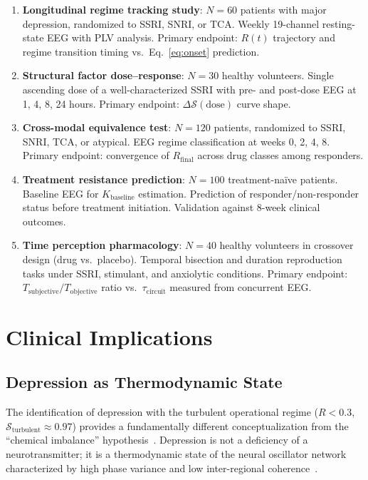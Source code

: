 \documentclass[twocolumn,10pt]{article}
\theoremstyle{remark}
\newcommand{\Rorder}{R}
\begin{document}
\begin{enumerate}
  \item \textbf{Longitudinal regime tracking study}: $N = 60$ patients with major depression, randomized to SSRI, SNRI, or TCA. Weekly 19-channel resting-state EEG with PLV analysis. Primary endpoint: $\Rorder(t)$ trajectory and regime transition timing vs.\ Eq.~\eqref{eq:onset} prediction.

  \item \textbf{Structural factor dose--response}: $N = 30$ healthy volunteers. Single ascending dose of a well-characterized SSRI with pre- and post-dose EEG at 1, 4, 8, 24 hours. Primary endpoint: $\Delta\mathcal{S}(\text{dose})$ curve shape.

  \item \textbf{Cross-modal equivalence test}: $N = 120$ patients, randomized to SSRI, SNRI, TCA, or atypical. EEG regime classification at weeks 0, 2, 4, 8. Primary endpoint: convergence of $\Rorder_{\mathrm{final}}$ across drug classes among responders.

  \item \textbf{Treatment resistance prediction}: $N = 100$ treatment-na\"ive patients. Baseline EEG for $K_{\mathrm{baseline}}$ estimation. Prediction of responder/non-responder status before treatment initiation. Validation against 8-week clinical outcomes.

  \item \textbf{Time perception pharmacology}: $N = 40$ healthy volunteers in crossover design (drug vs.\ placebo). Temporal bisection and duration reproduction tasks under SSRI, stimulant, and anxiolytic conditions. Primary endpoint: $T_{\mathrm{subjective}}/T_{\mathrm{objective}}$ ratio vs.\ $\tau_{\mathrm{circuit}}$ measured from concurrent EEG.
\end{enumerate}

\section{Clinical Implications}
\label{sec:clinical}

\subsection{Depression as Thermodynamic State}

The identification of depression with the turbulent operational regime ($\Rorder < 0.3$, $\mathcal{S}_{\mathrm{turbulent}} \approx 0.97$) provides a fundamentally different conceptualization from the ``chemical imbalance'' hypothesis~\citep{owens1997role}. Depression is not a deficiency of a neurotransmitter; it is a thermodynamic state of the neural oscillator network characterized by high phase variance and low inter-regional coherence~\citep{uhlhaas2006neural}.
\end{document}
